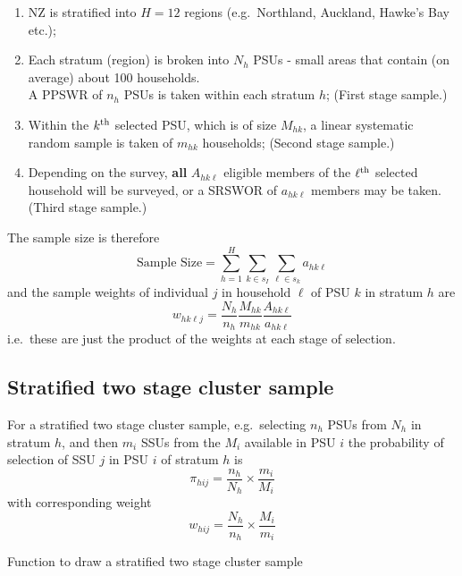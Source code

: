 \documentclass[
]{book}
\providecommand{\tightlist}{%
  \setlength{\itemsep}{0pt}\setlength{\parskip}{0pt}}
\begin{document}
\begin{enumerate}
\def\labelenumi{\arabic{enumi}.}
\tightlist
\item
  NZ is stratified into \(H=12\) regions (e.g.~Northland, Auckland, Hawke's
  Bay etc.);
\item
  Each stratum (region) is broken into \(N_h\) PSUs - small areas that
  contain (on average) about 100 households.\\
  A PPSWR of \(n_h\) PSUs is taken within each stratum \(h\); (First stage sample.)
\item
  Within the \(k^{\rm th}\) selected PSU, which is of size \(M_{hk}\), a linear
  systematic random sample is taken of \(m_{hk}\) households; (Second stage
  sample.)
\item
  Depending on the survey, \textbf{all} \(A_{hk\ell}\) eligible members of the
  \(\ell^{\rm th}\) selected
  household will be surveyed, or a SRSWOR of \(a_{hk\ell}\) members may be taken.
  (Third stage sample.)
\end{enumerate}

The sample size is therefore
\[
   \text{Sample Size} = 
   \sum_{h=1}^H\sum_{k\in s_I}\sum_{\ell\in s_k} a_{hk\ell}
\]
and the sample weights of individual \(j\) in household \(\ell\) of PSU \(k\) in
stratum \(h\) are
\[
   w_{hk\ell j} = \frac{N_h}{n_h}\frac{M_{hk}}{m_{hk}}
                  \frac{A_{hk\ell}}{a_{hk\ell}}
\]
i.e.~these are just the product of the weights at each stage of selection.

\subsection{Stratified two stage cluster sample}\label{stratified-two-stage-cluster-sample}

For a stratified two stage cluster sample, e.g.~selecting \(n_h\) PSUs from \(N_h\)
in stratum \(h\), and then \(m_i\) SSUs from the \(M_i\) available in PSU \(i\) the
probability of selection of SSU \(j\) in PSU \(i\) of stratum \(h\) is
\[
   \pi_{hij} = \frac{n_h}{N_h}\times\frac{m_i}{M_i}
\]
with corresponding weight
\[
   w_{hij} = \frac{N_h}{n_h}\times\frac{M_i}{m_i}
\]

Function to draw a stratified two stage cluster sample
\end{document}

